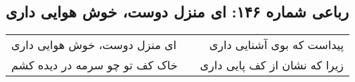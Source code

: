 \begin{center}
\section*{رباعی شماره ۱۴۶: ای منزل دوست، خوش هوایی داری}
\label{sec:146}
\begin{longtable}{l p{0.5cm} r}
ای منزل دوست، خوش هوایی داری
&&
پیداست که بوی آشنایی داری
\\
خاک کف تو چو سرمه در دیده کشم
&&
زیرا که نشان از کف پایی داری
\\
\end{longtable}
\end{center}
